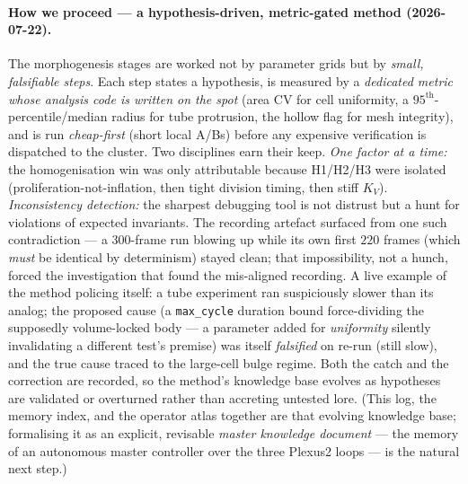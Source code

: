 \documentclass[11pt]{article}
\begin{document}
\paragraph{How we proceed --- a hypothesis-driven, metric-gated method (2026-07-22).}
The morphogenesis stages are worked not by parameter grids but by \emph{small, falsifiable steps}. Each
step states a hypothesis, is measured by a \emph{dedicated metric whose analysis code is written on the
spot} (area CV for cell uniformity, a $95^{\text{th}}$-percentile/median radius for tube protrusion, the
hollow flag for mesh integrity), and is run \emph{cheap-first} (short local A/Bs) before any expensive
verification is dispatched to the cluster. Two disciplines earn their keep. \emph{One factor at a time:}
the homogenisation win was only attributable because H1/H2/H3 were isolated (proliferation-not-inflation,
then tight division timing, then stiff $K_V$). \emph{Inconsistency detection:} the sharpest debugging
tool is not distrust but a hunt for violations of expected invariants. The recording artefact surfaced
from one such contradiction --- a $300$-frame run blowing up while its own first $220$ frames (which
\emph{must} be identical by determinism) stayed clean; that impossibility, not a hunch, forced the
investigation that found the mis-aligned recording. A live example of the method policing itself: a tube
experiment ran suspiciously slower than its analog; the proposed cause (a \texttt{max\_cycle} duration
bound force-dividing the supposedly volume-locked body --- a parameter added for \emph{uniformity}
silently invalidating a different test's premise) was itself \emph{falsified} on re-run (still slow), and
the true cause traced to the large-cell bulge regime. Both the catch and the correction are recorded, so
the method's knowledge base evolves as hypotheses are validated or overturned rather than accreting
untested lore. (This log, the memory index, and the operator atlas together are that evolving knowledge
base; formalising it as an explicit, revisable \emph{master knowledge document} --- the memory of an
autonomous master controller over the three Plexus2 loops --- is the natural next step.)
\end{document}

